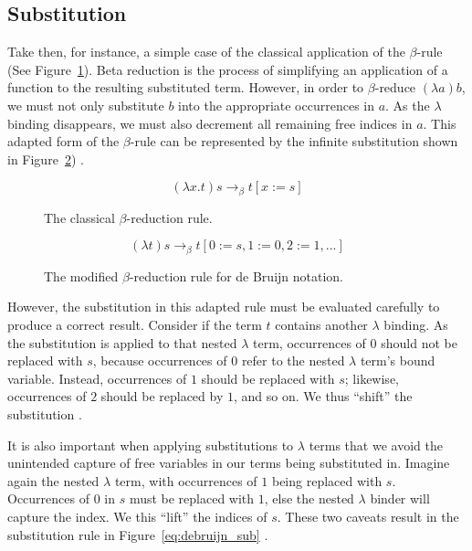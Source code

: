 \subsection{Substitution}
\label{sub:lambda_calc_subst}

Take then, for instance, a simple case of the classical application of the $\beta$-rule (See Figure~\ref{eq:beta_rule}). Beta reduction is the process of simplifying an application of a function to the resulting substituted term. However, in order to $\beta$-reduce $(\lambda a)b$, we must not only substitute $b$ into the appropriate occurrences in $a$. As the $\lambda$ binding disappears, we must also decrement all remaining free indices in $a$. This adapted form of the $\beta$-rule can be represented by the infinite substitution shown in Figure~\ref{eq:beta_rule2}) \citep{Abadi-Cardelli-Curien-Levy-1990}.

\begin{figure}[h]
\begin{equation*}
(\lambda x.t)s \to_{\beta} t[x := s]
\end{equation*}
\caption{The classical $\beta$-reduction rule.}
\label{eq:beta_rule}
\end{figure}

\begin{figure}[h]
\begin{equation*}
(\lambda t)s \to_{\beta} t[0 := s, 1 := 0, 2 := 1, ...]
\end{equation*}
\caption{The modified $\beta$-reduction rule for de Bruijn notation.}
\label{eq:beta_rule2}
\end{figure}

However, the substitution in this adapted rule must be evaluated carefully to produce a correct result. Consider if the term $t$ contains another $\lambda$ binding. As the substitution is applied to that nested $\lambda$ term, occurrences of $0$ should not be replaced with $s$, because occurrences of $0$ refer to the nested $\lambda$ term's bound variable. Instead, occurrences of $1$ should be replaced with $s$; likewise, occurrences of $2$ should be replaced by $1$, and so on. We thus ``shift'' the substitution \citep{Abadi-Cardelli-Curien-Levy-1990}.

It is also important when applying substitutions to $\lambda$ terms that we avoid the unintended capture of free variables in our terms being substituted in. Imagine again the nested $\lambda$ term, with occurrences of $1$ being replaced with $s$. Occurrences of $0$ in $s$ must be replaced with $1$, else the nested $\lambda$ binder will capture the index. We this ``lift'' the indices of $s$. These two caveats result in the substitution rule in Figure~\ref{eq:debruijn_sub} \citep{Abadi-Cardelli-Curien-Levy-1990}.

